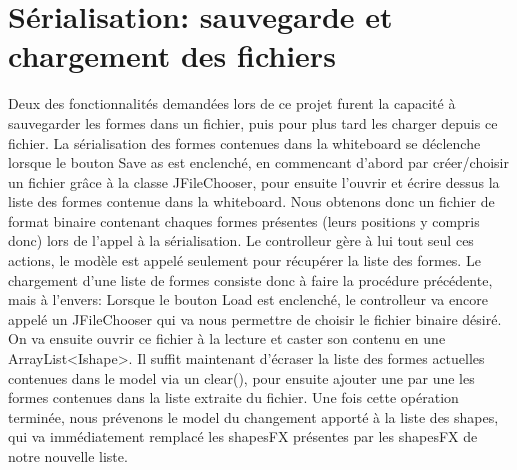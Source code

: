 \chapter{Sérialisation: sauvegarde et chargement des fichiers}


Deux des fonctionnalités demandées lors de ce projet furent la capacité à
sauvegarder les formes dans un fichier, puis pour plus tard les charger
depuis ce fichier.\newline
La sérialisation des formes contenues dans la whiteboard se déclenche lorsque
le bouton Save as est enclenché, en
commencant d'abord par créer/choisir un fichier grâce à la classe JFileChooser,
pour ensuite l'ouvrir et écrire dessus la liste des formes contenue dans la
whiteboard. Nous obtenons donc un fichier de format binaire contenant chaques
formes présentes (leurs positions y compris donc) lors de l'appel à la
sérialisation. Le controlleur gère à lui tout seul ces actions, le modèle est
appelé seulement pour récupérer la liste des formes.\newline
Le chargement d'une liste de formes consiste donc à faire la procédure
précédente, mais à l'envers: Lorsque le bouton Load est enclenché, le
controlleur va encore appelé un JFileChooser qui va nous permettre de choisir
le fichier binaire désiré. On va ensuite ouvrir ce fichier à la lecture et
caster son contenu en une ArrayList<Ishape>. Il suffit maintenant d'écraser la
liste des formes actuelles contenues dans le model via un clear(), pour
ensuite ajouter une par une les formes contenues dans la liste extraite du
fichier. Une fois cette opération terminée, nous prévenons le model du
changement apporté à la liste des shapes, qui va immédiatement remplacé les
shapesFX présentes par les shapesFX de notre nouvelle liste.\newline

